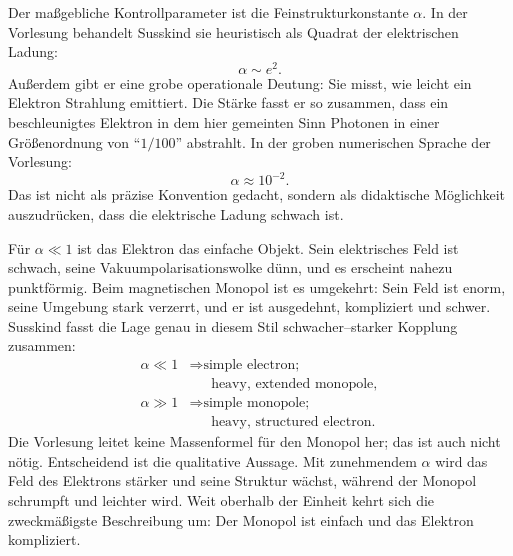 Der maßgebliche Kontrollparameter ist die Feinstrukturkonstante \(\alpha\). In der Vorlesung behandelt Susskind sie heuristisch als Quadrat der elektrischen Ladung:
\begin{equation}
\alpha \sim e^2.
\end{equation}
Außerdem gibt er eine grobe operationale Deutung: Sie misst, wie leicht ein Elektron Strahlung emittiert. Die Stärke fasst er so zusammen, dass ein beschleunigtes Elektron in dem hier gemeinten Sinn Photonen in einer Größenordnung von ``\(1/100\)'' abstrahlt. In der groben numerischen Sprache der Vorlesung:
\begin{equation}
\alpha \approx 10^{-2}.
\end{equation}
Das ist nicht als präzise Konvention gedacht, sondern als didaktische Möglichkeit auszudrücken, dass die elektrische Ladung schwach ist.


Für \(\alpha\ll 1\) ist das Elektron das einfache Objekt. Sein elektrisches Feld ist schwach, seine Vakuumpolarisationswolke dünn, und es erscheint nahezu punktförmig. Beim magnetischen Monopol ist es umgekehrt: Sein Feld ist enorm, seine Umgebung stark verzerrt, und er ist ausgedehnt, kompliziert und schwer. Susskind fasst die Lage genau in diesem Stil schwacher--starker Kopplung zusammen:
\begin{equation}
\begin{aligned}
\alpha \ll 1
&\Rightarrow \text{simple electron;}\\
&\phantom{\Rightarrow{}}\text{heavy, extended monopole},\\
\alpha \gg 1
&\Rightarrow \text{simple monopole;}\\
&\phantom{\Rightarrow{}}\text{heavy, structured electron}.
\end{aligned}
\end{equation}
Die Vorlesung leitet keine Massenformel für den Monopol her; das ist auch nicht nötig. Entscheidend ist die qualitative Aussage. Mit zunehmendem \(\alpha\) wird das Feld des Elektrons stärker und seine Struktur wächst, während der Monopol schrumpft und leichter wird. Weit oberhalb der Einheit kehrt sich die zweckmäßigste Beschreibung um: Der Monopol ist einfach und das Elektron kompliziert.

